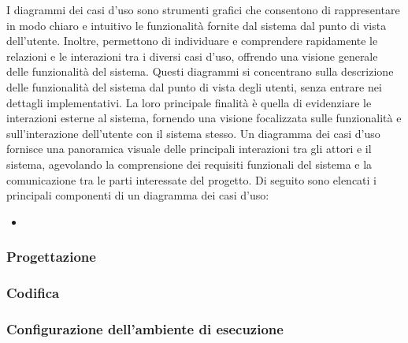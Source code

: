 I diagrammi dei casi d'uso sono strumenti grafici che consentono di rappresentare in modo chiaro e intuitivo le funzionalità fornite dal sistema dal punto di vista dell'utente. Inoltre, permettono di individuare e comprendere rapidamente le relazioni e le interazioni tra i diversi casi d'uso, offrendo una visione generale delle funzionalità del sistema.
Questi diagrammi si concentrano sulla descrizione delle funzionalità del sistema dal punto di vista degli utenti, senza entrare nei dettagli implementativi. La loro principale finalità è quella di evidenziare le interazioni esterne al sistema, fornendo una visione focalizzata sulle funzionalità e sull'interazione dell'utente con il sistema stesso.
Un diagramma dei casi d'uso fornisce una panoramica visuale delle principali interazioni tra gli attori e il sistema, agevolando la comprensione dei requisiti funzionali del sistema e la comunicazione tra le parti interessate del progetto.
Di seguito sono elencati i principali componenti di un diagramma dei casi d'uso:
\begin{itemize}
	\item 
\end{itemize}

\subsubsection{Progettazione}
\subsubsection{Codifica}
\subsubsection{Configurazione dell'ambiente di esecuzione}

